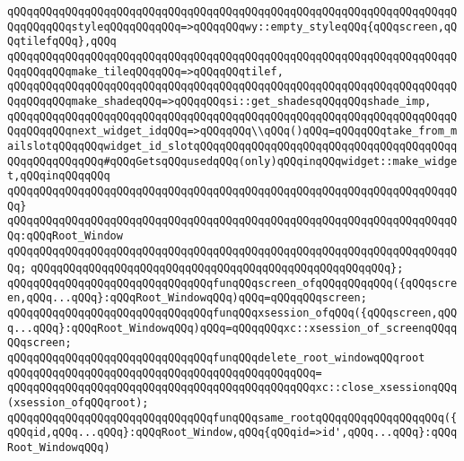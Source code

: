 \verb|qQQqqQQqqQQqqQQqqQQqqQQqqQQqqQQqqQQqqQQqqQQqqQQqqQQqqQQqqQQqqQQqqQQqqQQqqQQqqQQqstyleqQQqqQQqqQQq=>qQQqqQQqwy::empty_styleqQQq{qQQqscreen,qQQqtilefqQQq},qQQq|\newline
\verb|qQQqqQQqqQQqqQQqqQQqqQQqqQQqqQQqqQQqqQQqqQQqqQQqqQQqqQQqqQQqqQQqqQQqqQQqqQQqqQQqmake_tileqQQqqQQq=>qQQqqQQqtilef,|\newline
\newline
\verb|qQQqqQQqqQQqqQQqqQQqqQQqqQQqqQQqqQQqqQQqqQQqqQQqqQQqqQQqqQQqqQQqqQQqqQQqqQQqqQQqmake_shadeqQQq=>qQQqqQQqsi::get_shadesqQQqqQQqshade_imp,|\newline
\newline
\verb|qQQqqQQqqQQqqQQqqQQqqQQqqQQqqQQqqQQqqQQqqQQqqQQqqQQqqQQqqQQqqQQqqQQqqQQqqQQqqQQqnext_widget_idqQQq=>qQQqqQQq\\qQQq()qQQq=qQQqqQQqtake_from_mailslotqQQqqQQqwidget_id_slotqQQqqQQqqQQqqQQqqQQqqQQqqQQqqQQqqQQqqQQqqQQqqQQqqQQqqQQq#qQQqGetsqQQqusedqQQq(only)qQQqinqQQqwidget::make_widget,qQQqinqQQqqQQq|\newline
\verb|qQQqqQQqqQQqqQQqqQQqqQQqqQQqqQQqqQQqqQQqqQQqqQQqqQQqqQQqqQQqqQQqqQQqqQQq}|\newline
\verb|qQQqqQQqqQQqqQQqqQQqqQQqqQQqqQQqqQQqqQQqqQQqqQQqqQQqqQQqqQQqqQQqqQQqqQQq:qQQqRoot_Window|\newline
\verb|qQQqqQQqqQQqqQQqqQQqqQQqqQQqqQQqqQQqqQQqqQQqqQQqqQQqqQQqqQQqqQQqqQQqqQQq;|\newline
\verb|qQQqqQQqqQQqqQQqqQQqqQQqqQQqqQQqqQQqqQQqqQQqqQQqqQQqqQQq};|\newline
\newline
\verb|qQQqqQQqqQQqqQQqqQQqqQQqqQQqqQQqfunqQQqscreen_ofqQQqqQQqqQQq({qQQqscreen,qQQq...qQQq}:qQQqRoot_WindowqQQq)qQQq=qQQqqQQqscreen;|\newline
\verb|qQQqqQQqqQQqqQQqqQQqqQQqqQQqqQQqfunqQQqxsession_ofqQQq({qQQqscreen,qQQq...qQQq}:qQQqRoot_WindowqQQq)qQQq=qQQqqQQqxc::xsession_of_screenqQQqqQQqscreen;|\newline
\newline
\verb|qQQqqQQqqQQqqQQqqQQqqQQqqQQqqQQqfunqQQqdelete_root_windowqQQqroot|\newline
\verb|qQQqqQQqqQQqqQQqqQQqqQQqqQQqqQQqqQQqqQQqqQQqqQQq=|\newline
\verb|qQQqqQQqqQQqqQQqqQQqqQQqqQQqqQQqqQQqqQQqqQQqqQQqxc::close_xsessionqQQq(xsession_ofqQQqroot);|\newline
\newline
\verb|qQQqqQQqqQQqqQQqqQQqqQQqqQQqqQQqfunqQQqsame_rootqQQqqQQqqQQqqQQqqQQq({qQQqid,qQQq...qQQq}:qQQqRoot_Window,qQQq{qQQqid=>id',qQQq...qQQq}:qQQqRoot_WindowqQQq)|\newline
